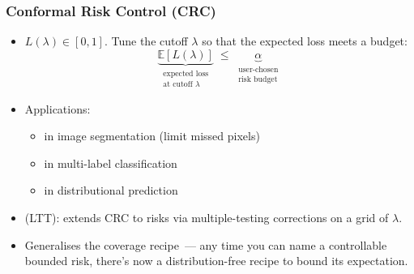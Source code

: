 \documentclass[11pt, aspectratio=169, xcolor={dvipsnames}, usepdftitle=false]{beamer}
\begin{document}
\begin{frame}
\frametitle{Conformal Risk Control (CRC)}
\begin{itemize}
\item {} $L(\lambda) \in [0, 1]$. Tune the cutoff $\lambda$ so that the expected loss meets a budget:
\begin{equation*}
\underbrace{\mathbb{E}[L(\lambda)]}_{\substack{\text{expected loss}\\\text{at cutoff } \lambda}}
\;\leq\;
\underbrace{\alpha}_{\substack{\text{user-chosen}\\\text{risk budget}}}
\end{equation*}
\item Applications:
\begin{itemize}
\item {} in image segmentation (limit missed pixels)
\item {} in multi-label classification
\item {} in distributional prediction
\end{itemize}
\item {} (LTT): extends CRC to  risks via multiple-testing corrections on a grid of $\lambda$.
\item Generalises the coverage recipe~--- any time you can name a controllable bounded risk, there's now a distribution-free recipe to bound its expectation.
\end{itemize}
\end{frame}
\end{document}
